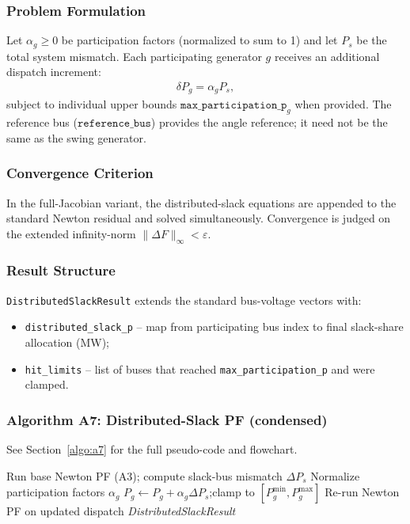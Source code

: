 \subsubsection{Problem Formulation}

Let $\alpha_g \ge 0$ be participation factors (normalized to sum to 1) and let
$P_s$ be the total system mismatch.  Each participating generator $g$ receives
an additional dispatch increment:
\begin{align}
\delta P_g = \alpha_g P_s,
\end{align}
subject to individual upper bounds \(\texttt{max\_participation\_p}_g\) when
provided.  The reference bus ($\texttt{reference\_bus}$) provides the angle
reference; it need not be the same as the swing generator.

\subsubsection{Convergence Criterion}

In the full-Jacobian variant, the distributed-slack equations are appended to
the standard Newton residual and solved simultaneously.  Convergence is judged
on the extended infinity-norm \(\|\Delta F\|_\infty < \varepsilon\).

\subsubsection{Result Structure}

\texttt{DistributedSlackResult} extends the standard bus-voltage vectors with:
\begin{itemize}
  \item \texttt{distributed\_slack\_p} -- map from participating bus index to
  final slack-share allocation (MW);
  \item \texttt{hit\_limits} -- list of buses that reached
  \texttt{max\_participation\_p} and were clamped.
\end{itemize}

\subsubsection{Algorithm A7: Distributed-Slack PF (condensed)}
\label{algo:a7-inline}
See Section~\ref{algo:a7} for the full pseudo-code and flowchart.

\begin{algorithmic}[1]
  \State Run base Newton PF (A3); compute slack-bus mismatch $\Delta P_s$
  \State Normalize participation factors $\alpha_g$
    \State $P_g \gets P_g + \alpha_g \Delta P_s$;\quad clamp to $[P_g^{\min}, P_g^{\max}]$
  \EndFor
  \State Re-run Newton PF on updated dispatch
  \State \Return \textit{DistributedSlackResult}
\EndProcedure
\end{algorithmic}

